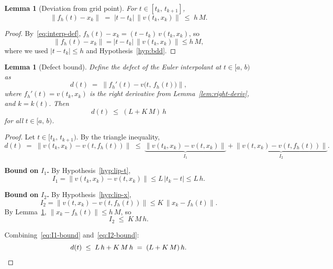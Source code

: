 \documentclass[11pt,a4paper]{article}
\newtheorem{lemma}[theorem]{Lemma}
\theoremstyle{definition}
\newcommand{\norm}[1]{\lVert #1 \rVert}
\newcommand{\abs}[1]{\lvert #1 \rvert}
\newcommand{\Icc}[2]{[#1,\, #2]}
\newcommand{\Ico}[2]{[#1,\, #2)}
\begin{document}
\begin{lemma}[Deviation from grid point]\label{lem:deviation}
For $t \in \Icc{t_k}{t_{k+1}}$,
\begin{equation}\label{eq:deviation}
  \norm{f_h(t) - x_k} \;=\; \abs{t - t_k}\,\norm{v(t_k, x_k)}
  \;\le\; h\,M.
\end{equation}
\end{lemma}

\begin{proof}
By~\eqref{eq:interp-def},
$f_h(t) - x_k = (t - t_k)\,v(t_k, x_k)$, so
\[
  \norm{f_h(t) - x_k}
  = \abs{t - t_k}\,\norm{v(t_k, x_k)}
  \le h\,M,
\]
where we used $\abs{t - t_k} \le h$ and Hypothesis~\ref{hyp:bdd}.
\end{proof}


\begin{lemma}[Defect bound]\label{lem:defect}
Define the \emph{defect} of the Euler interpolant at $t \in \Ico{a}{b}$ as
\[
  d(t) \;=\; \norm{f_h'(t) - v\bigl(t,\, f_h(t)\bigr)},
\]
where $f_h'(t) = v(t_k, x_k)$ is the right derivative from
Lemma~\ref{lem:right-deriv}, and $k = k(t)$. Then
\begin{equation}\label{eq:defect-bound}
  d(t) \;\le\; (L + K\,M)\,h
\end{equation}
for all $t \in \Ico{a}{b}$.
\end{lemma}

\begin{proof}
Let $t \in \Ico{t_k}{t_{k+1}}$. By the triangle inequality,
\begin{equation}\label{eq:defect-split}
  d(t) \;=\; \norm{v(t_k, x_k) - v(t, f_h(t))}
  \;\le\; \underbrace{\norm{v(t_k, x_k) - v(t, x_k)}}_{I_1}
       +  \underbrace{\norm{v(t, x_k) - v(t, f_h(t))}}_{I_2}.
\end{equation}

\textbf{Bound on $I_1$.}
By Hypothesis~\ref{hyp:lip-t},
\begin{equation}\label{eq:I1-bound}
  I_1 = \norm{v(t_k, x_k) - v(t, x_k)}
  \le L\,\abs{t_k - t}
  \le L\,h.
\end{equation}

\textbf{Bound on $I_2$.}
By Hypothesis~\ref{hyp:lip-x},
\[
  I_2 = \norm{v(t, x_k) - v(t, f_h(t))}
  \le K\,\norm{x_k - f_h(t)}.
\]
By Lemma~\ref{lem:deviation}, $\norm{x_k - f_h(t)} \le h\,M$, so
\begin{equation}\label{eq:I2-bound}
  I_2 \;\le\; K\,M\,h.
\end{equation}

Combining~\eqref{eq:I1-bound} and~\eqref{eq:I2-bound}:
\[
  d(t) \;\le\; L\,h + K\,M\,h \;=\; (L + K\,M)\,h.
  \qedhere
\]
\end{proof}
\end{document}
